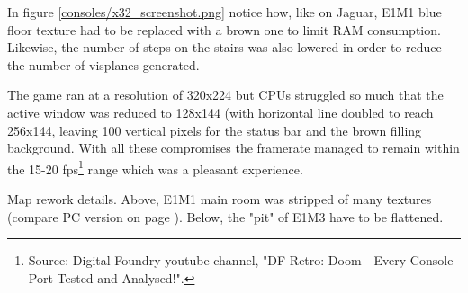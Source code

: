 In figure \ref{consoles/x32_screenshot.png} notice how, like on Jaguar, E1M1 blue floor texture had to be replaced with a brown one to limit RAM consumption. Likewise, the number of steps on the stairs was also lowered in order to reduce the number of visplanes generated.\\
\par
The game ran at a resolution of 320x224 but CPUs struggled so much that the active window was reduced to 128x144 (with horizontal line doubled to reach 256x144, leaving 100 vertical pixels for the status bar and the brown filling background. With all these compromises the framerate managed to remain within the 15-20 fps\footnote{Source: Digital Foundry youtube channel, "DF Retro: Doom - Every Console Port Tested and Analysed!".} range which was a pleasant experience.\\
\par
{}



\par
Map rework details. Above, E1M1 main room was stripped of many textures (compare PC version on page \pageref{complex_scene_plain_light.png}). Below, the "pit" of E1M3 have to be flattened.\\
\par
{}






